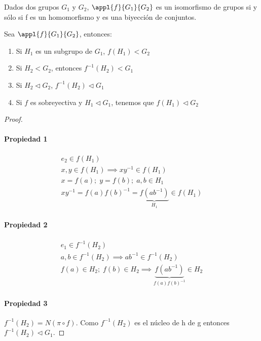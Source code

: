 \documentclass[a4paper,10pt]{apuntes}
\begin{document}
\begin{remark} Dados dos grupos $G_1$ y $G_2$, $\appl{f}{G_1}{G_2}$ es un isomorfismo de grupos si y sólo si f es un homomorfismo y es una biyección de conjuntos.
\end{remark}

\begin{lemma}
Sea $\appl{f}{G_1}{G_2}$, entonces:
\begin{enumerate}
\item Si $H_1$ es un subgrupo de $G_1$, $f(H_1)<G_2$
\item Si $H_2 < G_2$, entonces $f^{-1}(H_2)<G_1$
\item Si $H_2 \lhd G_2$, $f^{-1}(H_2)\lhd G_1$
\item Si $f$ es sobreyectiva y $H_1\lhd G_1$, tenemos que $f(H_1)\lhd G_2$
\end{enumerate}
\end{lemma}

\begin{proof}
\paragraph{Propiedad 1}
\begin{gather*}
e_2 \in f(H_1)\\
x, y\in f(H_1) \implies xy^{-1}\in f(H_1)\\
x=f(a);\; y = f(b);\; a, b\in H_1\\
xy^{-1}=f(a)f(b)^{-1} = \underbrace{f(ab^{-1})}_{H_1} \in f(H_1)
\end{gather*}

\paragraph{Propiedad 2}
\begin{gather*}
e_1 \in f^{-1}(H_2)\\
a, b \in f^{-1}(H_2) \implies ab^{-1} \in f^{-1}(H_2)\\
f(a) \in H_2;\; f(b) \in H_2 \implies \underbrace{f(ab^{-1})}_{f(a)f(b)^{-1}}\in H_2
\end{gather*}

\paragraph{Propiedad 3}
$f^{-1}(H_2) = N(\pi \circ f)$. Como $f^{-1}(H_2)$ es el núcleo de h de g entonces $f^{-1}(H_2)\lhd G_1$.
\end{proof}
\end{document}

